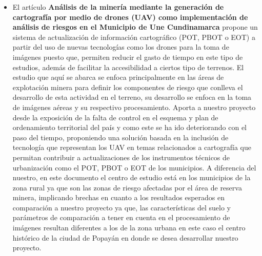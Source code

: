\begin{itemize}
        \item El artículo \textbf{Análisis de la minería mediante la generación de cartografía
        por medio de drones (UAV) como implementación de análisis de riesgos en el Municipio de Une Cundinamarca}\cite{rojas_velasquez_alisis_nodate} propone un sistema de actualización de información cartográfico (POT, PBOT o EOT) a partir del uso de nuevas tecnologías como los drones para la toma de imágenes puesto que, permiten reducir el gasto de tiempo en este tipo de estudios, además de facilitar la accesibilidad a ciertos tipo de terrenos. El estudio que aquí se abarca se enfoca principalmente en las áreas de explotación minera para definir los componentes de riesgo que conlleva el desarrollo de esta actividad en el terreno, su desarrollo se enfoca en la toma de imágenes aéreas y su respectivo procesamiento.
        Aporta a nuestro proyecto desde la exposición de la falta de control en el esquema y plan de ordenamiento territorial del país y como este se ha ido deteriorando con el paso del tiempo, proponiendo una solución basada en la inclusión de tecnología que representan los UAV en temas relacionados a cartografía que permitan contribuir a actualizaciones de los instrumentos técnicos de urbanización como el POT, PBOT o EOT de los municipios. 
        A diferencia del nuestro, en este documento el centro de estudio está en los municipios de la zona rural ya que son las zonas de riesgo afectadas por el área de reserva minera, implicando brechas en cuanto a los resultados esperados en comparación a nuestro proyecto ya que, las características del suelo y parámetros de comparación a tener en cuenta en el procesamiento de imágenes resultan diferentes a los de la zona urbana en este caso el centro histórico de la ciudad de Popayán en donde se desea desarrollar nuestro proyecto.
        

\end{itemize}
